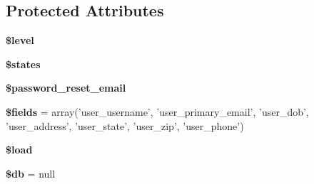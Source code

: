 \subsection*{Protected Attributes}
\begin{DoxyCompactItemize}
\item 
\hypertarget{class_api_controller_abd32cc82c6a3f79491987de36ad580ca}{
{\bfseries \$level}}
\label{class_api_controller_abd32cc82c6a3f79491987de36ad580ca}

\item 
\hypertarget{class_api_controller_a549939c02296e57c0416f3dedccc61ec}{
{\bfseries \$states}}
\label{class_api_controller_a549939c02296e57c0416f3dedccc61ec}

\item 
\hypertarget{class_api_controller_a5231f402d31b1ee88efda09919f54682}{
{\bfseries \$password\_\-reset\_\-email}}
\label{class_api_controller_a5231f402d31b1ee88efda09919f54682}

\item 
\hypertarget{class_api_controller_ab2303c817e3b402b77b7f99627b9c319}{
{\bfseries \$fields} = array('user\_\-username', 'user\_\-primary\_\-email', 'user\_\-dob', 'user\_\-address', 'user\_\-state', 'user\_\-zip', 'user\_\-phone')}
\label{class_api_controller_ab2303c817e3b402b77b7f99627b9c319}

\item 
\hypertarget{class_controller_a98494fb905b8ee62599dad677dd67fe0}{
{\bfseries \$load}}
\label{class_controller_a98494fb905b8ee62599dad677dd67fe0}

\item 
\hypertarget{class_object_a1fa3127fc82f96b1436d871ef02be319}{
{\bfseries \$db} = null}
\label{class_object_a1fa3127fc82f96b1436d871ef02be319}

\end{DoxyCompactItemize}
